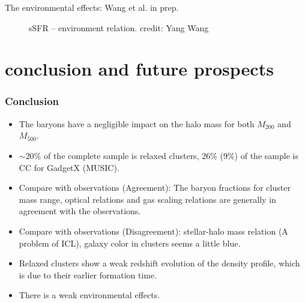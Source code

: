 \documentclass[aspectratio=43]{beamer}
\begin{document}
\begin{frame}{The environmental effects: Wang et al. in prep.}
{\begin{figure}
    \vspace{-0.6cm}
    \caption{sSFR -- environment relation. credit: Yang Wang}
  \end{figure}
  }
\end{frame}

\section{conclusion and future prospects}
\begin{frame}
  \frametitle{Conclusion}
  {
  \begin{itemize}
    \item The baryons have a negligible impact on the halo mass for both $M_{200}$ and $M_{500}$.
    \item $\sim 20 \%$ of the complete sample is relaxed clusters, 26\% (9\%) of the sample is CC for GadgetX (MUSIC).
    \item Compare with observations (Agreement): The baryon fractions for cluster mass range, optical relations and gas scaling relations are generally in agreement with the observations.
    \item Compare with observations (Disagreement):  stellar-halo mass relation (A problem of ICL), galaxy color in clusters seems a little blue.
    \item Relaxed clusters show a weak redshift evolution of the density profile, which is due to their earlier formation time.
    \item There is a weak environmental effects.
  \end{itemize}}
\end{frame}
\end{document}
